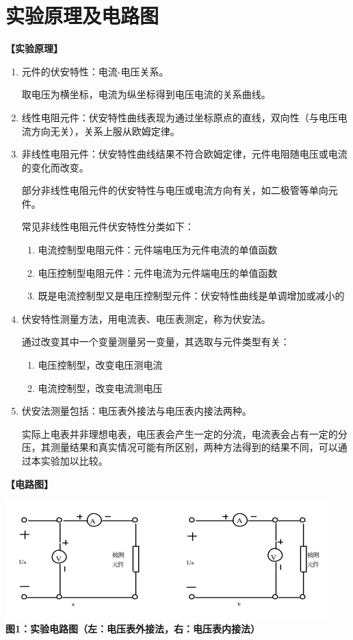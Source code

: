 \documentclass[a4paper]{article}
\begin{document}
\section{实验原理及电路图}
\begin{flushleft}
    \bfseries{}\songti 【实验原理】
\end{flushleft}
\begin{enumerate}
    \item 元件的伏安特性：电流-电压关系。\par 取电压为横坐标，电流为纵坐标得到电压电流的关系曲线。
    \item 线性电阻元件：伏安特性曲线表现为通过坐标原点的直线，双向性（与电压电流方向无关），关系上服从欧姆定律。
    \item 非线性电阻元件：伏安特性曲线结果不符合欧姆定律，元件电阻随电压或电流的变化而改变。\par 部分非线性电阻元件的伏安特性与电压或电流方向有关，如二极管等单向元件。\par 常见非线性电阻元件伏安特性分类如下：
        \begin{enumerate}
            \item 电流控制型电阻元件：元件端电压为元件电流的单值函数
            \item 电压控制型电阻元件：元件电流为元件端电压的单值函数
            \item 既是电流控制型又是电压控制型元件：伏安特性曲线是单调增加或减小的
        \end{enumerate}
    \item 伏安特性测量方法，用电流表、电压表测定，称为伏安法。\par 通过改变其中一个变量测量另一变量，其选取与元件类型有关：
        \begin{enumerate}
            \item 电压控制型，改变电压测电流
            \item 电流控制型，改变电流测电压
        \end{enumerate}
    \item 伏安法测量包括：电压表外接法与电压表内接法两种。\par 实际上电表并非理想电表，电压表会产生一定的分流，电流表会占有一定的分压，其测量结果和真实情况可能有所区别，两种方法得到的结果不同，可以通过本实验加以比较。
\end{enumerate}
\begin{flushleft}
    \bfseries{}\songti 【电路图】
\end{flushleft}
\begin{center}
    \includegraphics[width=\textwidth-40mm]{001}\\
    \bfseries{}\songti 图1：实验电路图（左：电压表外接法，右：电压表内接法）
\end{center}
\newpage
\end{document}
